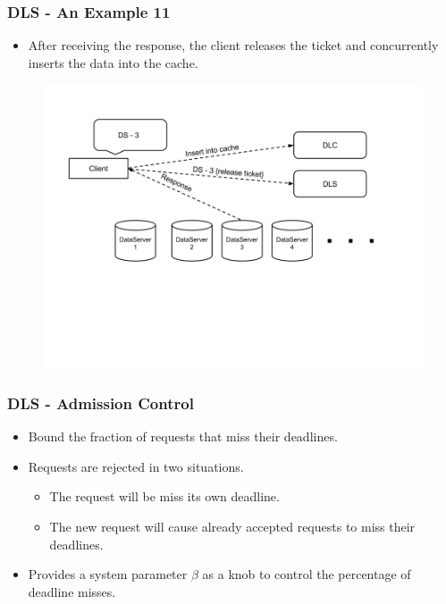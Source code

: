 \documentclass{beamer}
\begin{document}
\begin{frame}
  \frametitle{DLS - An Example 11}
  \begin{itemize}
  \item After receiving the response, the client releases
    the ticket and concurrently inserts the data into the cache.
  \end{itemize}
  \begin{figure}
    \begin{center}
      \centerline{\includegraphics[scale=0.35]{img/DLS_Example12.png}}
    \end{center}
  \end{figure}

\end{frame}


\begin{frame}
  \frametitle{DLS - Admission Control}
  \begin{itemize}
  \item Bound the fraction of requests that miss their deadlines.
  \item Requests are rejected in two situations.
    \begin{itemize}
    \item The request will be miss its own deadline.
    \item The new request will cause already accepted requests to miss their deadlines.
    \end{itemize}
  \item Provides a system parameter $\beta$ as a knob to control the percentage
    of deadline misses.
  \end{itemize}
\end{frame}
\end{document}
